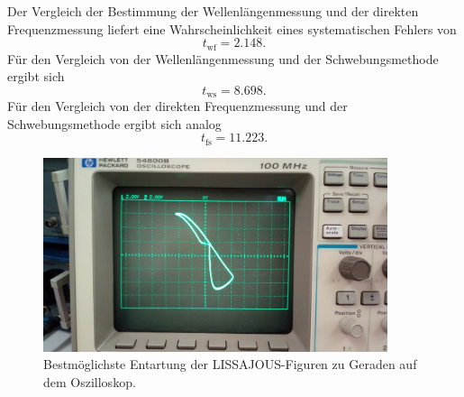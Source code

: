 Der Vergleich der Bestimmung der Wellenlängenmessung und der direkten Frequenzmessung liefert 
eine Wahrscheinlichkeit eines systematischen Fehlers von 
\begin{equation*}
	t_{\mathrm{wf}} = 2.148 \mathrm{.}
\end{equation*}
Für den Vergleich von der Wellenlängenmessung und der Schwebungsmethode ergibt sich
\begin{equation*}
	t_{\mathrm{ws}} = 8.698 \mathrm{.}
\end{equation*}
Für den Vergleich von der direkten Frequenzmessung und der Schwebungsmethode ergibt sich analog
\begin{equation*}
	t_{\mathrm{fs}} = 11.223 \mathrm{.}
\end{equation*}
\begin{figure}
	\includegraphics[width=0.9\textwidth]{Bilder/lissajou.jpeg}
	\caption{Bestmöglichste Entartung der LISSAJOUS-Figuren zu Geraden auf dem Oszilloskop.}
	\label{fig:Lisas}
\end{figure}
